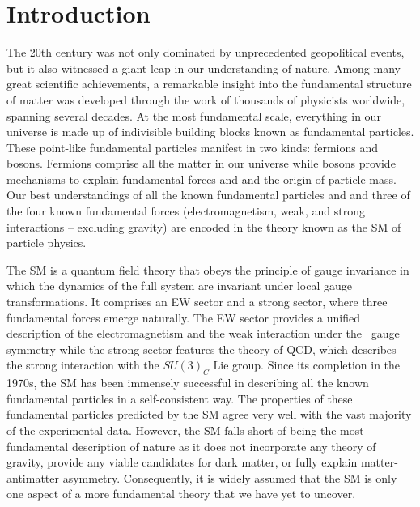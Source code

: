 \chapter{Introduction}
\label{chap:Introduction}

The 20th century was not only dominated by unprecedented geopolitical events, but it also witnessed a giant leap in our understanding of nature. Among many great scientific achievements, a remarkable insight into the fundamental structure of matter was developed through the work of thousands of physicists worldwide, spanning several decades. At the most fundamental scale, everything in our universe is made up of indivisible building blocks known as fundamental particles. These point-like fundamental particles manifest in two kinds: fermions and bosons. Fermions comprise all the matter in our universe while bosons provide mechanisms to explain fundamental forces and and the origin of particle mass. Our best understandings of all the known fundamental particles and and three of the four known fundamental forces (electromagnetism, weak, and strong interactions -- excluding gravity) are encoded in the theory known as the \ac{SM} of particle physics.

The \ac{SM} is a quantum field theory that obeys the principle of gauge invariance in which the dynamics of the full system are invariant under local gauge transformations. It comprises an \ac{EW} sector and a strong sector, where three fundamental forces emerge naturally. The \ac{EW} sector provides a unified description of the electromagnetism and the weak interaction under the \ew~gauge symmetry while the strong sector features the theory of \ac{QCD}, which describes the strong interaction with the $SU(3)_{C}$ Lie group. Since its completion in the 1970s, the \ac{SM} has been immensely successful in describing all the known fundamental particles in a self-consistent way. The properties of these fundamental particles predicted by the \ac{SM} agree very well with the vast majority of the experimental data. However, the \ac{SM} falls short of being the most fundamental description of nature as it does not incorporate any theory of gravity, provide any viable candidates for dark matter, or fully explain matter-antimatter asymmetry. Consequently, it is widely assumed that the \ac{SM} is only one aspect of a more fundamental theory that we have yet to uncover.

